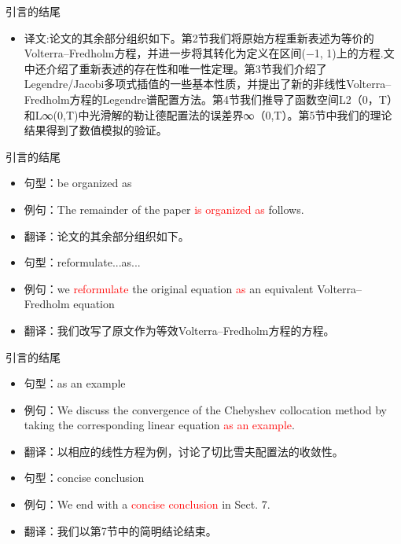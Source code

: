 \documentclass[13pt]{ctexbeamer}
\newcommand{\red}[1]{\textcolor{red}{#1}}
\begin{document}
\begin{frame}{引言的结尾}

\begin{itemize}
    \item 译文:论文的其余部分组织如下。第2节我们将原始方程重新表述为等价的Volterra–Fredholm方程，并进一步将其转化为定义在区间(−1, 1)上的方程.文中还介绍了重新表述的存在性和唯一性定理。第3节我们介绍了Legendre/Jacobi多项式插值的一些基本性质，并提出了新的非线性Volterra–Fredholm方程的Legendre谱配置方法。第4节我们推导了函数空间L2（0，T）和L∞(0,T)中光滑解的勒让德配置法的误差界∞（0,T）。第5节中我们的理论结果得到了数值模拟的验证。

\end{itemize}
\end{frame}

\begin{frame}{引言的结尾}

\begin{itemize}
    \item 句型：be organized as
    \item 例句：The remainder of the paper \red{is organized as} follows.
    \item 翻译：论文的其余部分组织如下。
    \newline
    \newline
    \item 句型：reformulate...as...
    \item 例句：we \red{reformulate} the original equation \red{as} an equivalent Volterra–Fredholm equation
    \item 翻译：我们改写了原文作为等效Volterra–Fredholm方程的方程。

\end{itemize}
\end{frame}

\begin{frame}{引言的结尾}

\begin{itemize}
    \item 句型：as an example
    \item 例句：We discuss the convergence of the Chebyshev collocation method by taking the corresponding linear equation \red{as an example}.
    \item 翻译：以相应的线性方程为例，讨论了切比雪夫配置法的收敛性。
    \newline
    \newline
    \item 句型：concise conclusion
    \item 例句：We end with a \red{concise conclusion} in Sect. 7.
    \item 翻译：我们以第7节中的简明结论结束。

\end{itemize}
\end{frame}
\end{document}
